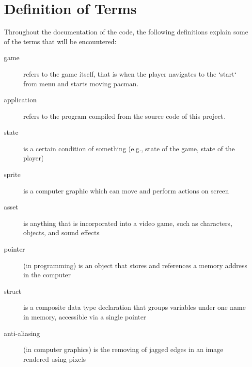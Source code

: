 \section{Definition of Terms}

Throughout the documentation of the code, the following definitions explain
some of the terms that will be encountered:

\begin{description}
    \item[game]{refers to the game itself, that is when the player navigates to
        the `start` from menu and starts moving pacman.}
    \item[application]{refers to the program compiled from the source code of this project.}
    \item[state]{is a certain condition of something (e.g., state of the game, state of the player)}
    \item[sprite]{is a computer graphic which can move and perform actions on screen}
    \item[asset]{is anything that is incorporated into a video game, such as characters, objects, and sound effects}
    \item[pointer]{(in programming) is an object that stores and references a memory address in the computer}
    \item[struct]{is a composite data type declaration that groups variables under one name in memory, accessible via a single pointer} 
    \item[anti-aliasing]{(in computer graphics) is the removing of jagged edges in an image rendered using pixels}
\end{description}
